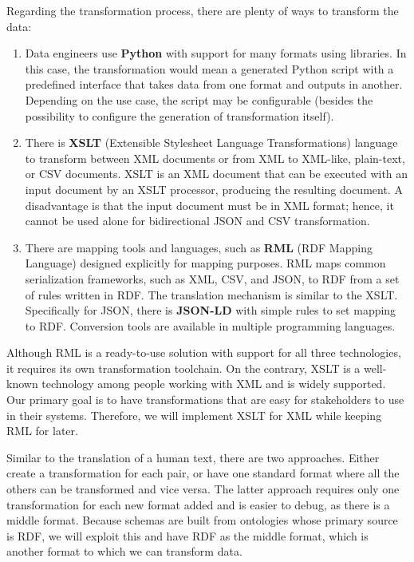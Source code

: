 Regarding the transformation process, there are plenty of ways to transform the data:
\begin{enumerate}
    \item Data engineers use \textbf{Python} with support for many formats using libraries. In this case, the transformation would mean a generated Python script with a predefined interface that takes data from one format and outputs in another. Depending on the use case, the script may be configurable (besides the possibility to configure the generation of transformation itself).
    \item There is \textbf{XSLT} (Extensible Stylesheet Language Transformations) language to transform between XML documents or from XML to XML-like, plain-text, or CSV documents. XSLT is an XML document that can be executed with an input document by an XSLT processor, producing the resulting document. A disadvantage is that the input document must be in XML format; hence, it cannot be used alone for bidirectional JSON and CSV transformation.
    \item There are mapping tools and languages, such as \textbf{RML} \cite{dimou2014rml} (RDF Mapping Language) designed explicitly for mapping purposes. RML maps common serialization frameworks, such as XML, CSV, and JSON, to RDF from a set of rules written in RDF. The translation mechanism is similar to the XSLT. Specifically for JSON, there is \textbf{JSON-LD} with simple rules to set mapping to RDF. Conversion tools are available in multiple programming languages.
\end{enumerate}

Although RML is a ready-to-use solution with support for all three technologies, it requires its own transformation toolchain. On the contrary, XSLT is a well-known technology among people working with XML and is widely supported. Our primary goal is to have transformations that are easy for stakeholders to use in their systems. Therefore, we will implement XSLT for XML while keeping RML for later.

Similar to the translation of a human text, there are two approaches. Either create a transformation for each pair, or have one standard format where all the others can be transformed and vice versa. The latter approach requires only one transformation for each new format added and is easier to debug, as there is a middle format. Because schemas are built from ontologies whose primary source is RDF, we will exploit this and have RDF as the middle format, which is another format to which we can transform data.


